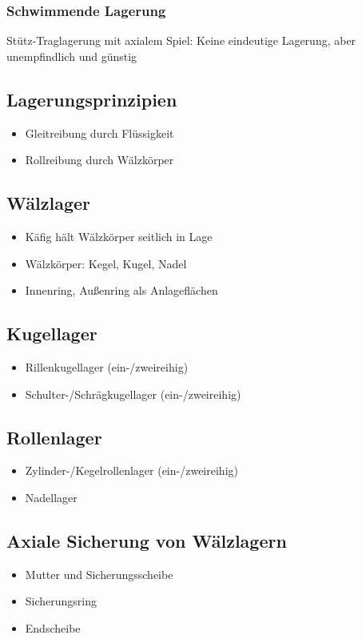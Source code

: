 \documentclass[a4paper,parskip=half*,DIV=7,fontsize=11pt]{scrartcl}
\begin{document}
\subsubsection{Schwimmende Lagerung}
Stütz-Traglagerung mit axialem Spiel:
Keine eindeutige Lagerung, aber unempfindlich und günstig
	
\subsection{Lagerungsprinzipien}
\begin{itemize}
	\item Gleitreibung durch Flüssigkeit
	\item Rollreibung durch Wälzkörper
\end{itemize}
	
\subsection{Wälzlager}
\begin{itemize}
	\item Käfig hält Wälzkörper seitlich in Lage
	\item Wälzkörper: Kegel, Kugel, Nadel
	\item Innenring, Außenring als Anlageflächen
\end{itemize}
	
\subsection{Kugellager}
\begin{itemize}
	\item Rillenkugellager (ein-/zweireihig)
	\item Schulter-/Schrägkugellager (ein-/zweireihig)		
\end{itemize}
	
\subsection{Rollenlager}
\begin{itemize}
	\item Zylinder-/Kegelrollenlager (ein-/zweireihig)
	\item Nadellager		
\end{itemize}
	
\subsection{Axiale Sicherung von Wälzlagern}
\begin{itemize}
	\item Mutter und Sicherungsscheibe
	\item Sicherungsring
	\item Endscheibe
\end{itemize}
	
\end{document}
